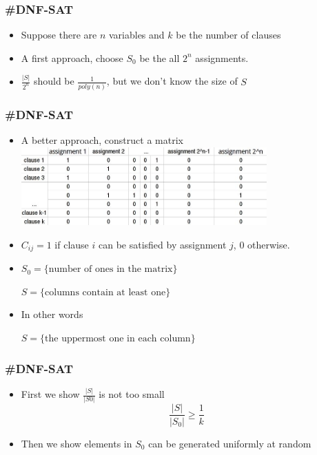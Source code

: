 \documentclass[table, usenames,dvipsnames,svgnames]{beamer}
\begin{document}
\begin{frame}
    \frametitle{\#DNF-SAT}
    \pause
    \begin{itemize}
        \item Suppose there are $n$ variables and $k$ be the number of clauses\pause
        \item A first approach, choose $S_0$ be the all $2^n$ assignments. \pause
        \item $\frac{|S|}{2^n}$ should be $\frac{1}{poly(n)}$, but we don't know the size of $S$
    \end{itemize}
\end{frame}

\begin{frame}
    \frametitle{\#DNF-SAT}
    \pause
    \begin{itemize}
        \item A better approach, construct a matrix
            \\
            \includegraphics[height=30mm]{table.jpg}\pause
        \item $C_{ij} = 1$ if clause $i$ can be satisfied by assignment $j$, $0$ otherwise.\pause
        \item $S_0 = \{\text{number of ones in the matrix}\}$

            $S = \{\text{columns contain at least one}\}$
                
        \item In other words

            $S = \{\text{the uppermost one in each column}\}$
\end{itemize}
\end{frame}

\begin{frame}
    \frametitle{\#DNF-SAT}
    \pause
    \begin{itemize}
        \item First we show $\frac{|S|}{|S0|}$ is not too small
            $$
            \frac{|S|}{|S_0|} \geq \frac{1}{k}
            $$\pause
        \item Then we show elements in $S_0$ can be generated uniformly at random
    \end{itemize}
\end{frame}
\end{document}
